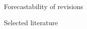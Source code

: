\documentclass[final]{beamer}
\newlength{\sepwidth}
\newlength{\colwidth}
\newcommand{\separatorcolumn}{\begin{column}{\sepwidth}\end{column}}
\begin{document}
\begin{frame}[t]
\begin{columns}[t]
\begin{column}{\colwidth}
\begin{block}{Forecastability of revisions}
  \end{block}

  \begin{block}{Selected literature}

    \nocite{*}
    \footnotesize{}

  \end{block}

\end{column}

\separatorcolumn
\end{columns}
\end{frame}
\end{document}
